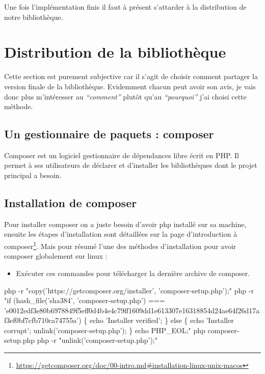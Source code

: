 \documentclass[11pt,a4paper,krantz2,11pt,oneside]{krantz}
\newenvironment{Shaded}{\begin{snugshade}}{\end{snugshade}}
\newcommand{\ExtensionTok}[1]{#1}
\newcommand{\NormalTok}[1]{#1}
\newcommand{\StringTok}[1]{\textcolor[rgb]{0.5,0.5,0.5}{#1}}
\providecommand{\tightlist}{%
  \setlength{\itemsep}{0pt}\setlength{\parskip}{0pt}}
\renewenvironment{quote}{\begin{VF}}{\end{VF}}
\renewcommand{\href}[2]{#2\footnote{\url{#1}}}
\begin{document}
Une fois l'implémentation finis il faut à présent s'attarder à la distribution de notre bibliothèque.

\hypertarget{distribution-de-la-bibliothuxe8que}{%
\section{Distribution de la bibliothèque}\label{distribution-de-la-bibliothuxe8que}}

Cette section est purement subjective car il s'agit de choisir comment partager la version finale de la bibliothèque. Evidemment chacun peut avoir son avis, je vais donc plus m'intéresser au \emph{``comment''} plutôt qu'au \emph{``pourquoi''} j'ai choisi cette méthode.

\hypertarget{un-gestionnaire-de-paquets-composer}{%
\subsection{Un gestionnaire de paquets : composer}\label{un-gestionnaire-de-paquets-composer}}

\begin{quote}
Composer est un logiciel gestionnaire de dépendances libre écrit en PHP. Il permet à ses utilisateurs de déclarer et d'installer les bibliothèques dont le projet principal a besoin.

\end{quote}

\hypertarget{installation-de-composer}{%
\subsection{Installation de composer}\label{installation-de-composer}}

Pour installer composer on a juste besoin d'avoir php installé sur sa machine, ensuite les étapes d'installation sont détaillées sur la page d'\href{https://getcomposer.org/doc/00-intro.md\#installation-linux-unix-macos}{introduction à composer}. Mais pour résumé l'une des méthodes d'installation pour avoir composer globalement sur linux :

\begin{itemize}
\tightlist
\item
  Exécuter ces commandes pour télécharger la dernière archive de composer.
\end{itemize}

\begin{Shaded}
\begin{Highlighting}[]
\ExtensionTok{php}\NormalTok{ -r }\StringTok{"copy('https://getcomposer.org/installer', 'composer-setup.php');"}
\ExtensionTok{php}\NormalTok{ -r }\StringTok{"if (hash_file('sha384', 'composer-setup.php') === 'e0012edf3e80b6978849f5eff0d4b4e4c79ff1609dd1e613307e16318854d24ae64f26d17af3ef0bf7cfb710ca74755a') \{ echo 'Installer verified'; \} else \{ echo 'Installer corrupt'; unlink('composer-setup.php'); \} echo PHP_EOL;"}
\ExtensionTok{php}\NormalTok{ composer-setup.php}
\ExtensionTok{php}\NormalTok{ -r }\StringTok{"unlink('composer-setup.php');"}
\end{Highlighting}
\end{Shaded}
\end{document}
